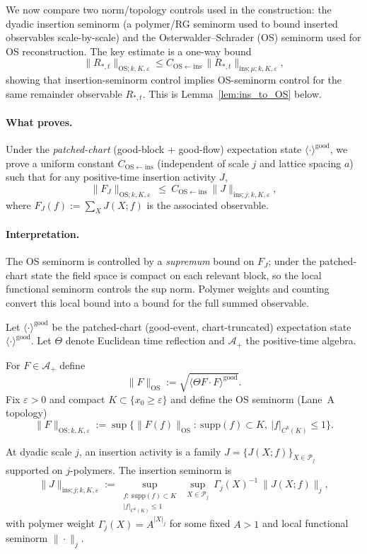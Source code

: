 We now compare two norm/topology controls used in the construction:
the dyadic insertion seminorm (a polymer/RG seminorm used to bound inserted observables scale-by-scale) and
the Osterwalder--Schrader (OS) seminorm used for OS reconstruction.
The key estimate is a one-way bound
\[
\|R_{*,t}\|_{\mathrm{OS};k,K,\varepsilon}\le C_{\mathrm{OS}\leftarrow\mathrm{ins}}\,
\|R_{*,t}\|_{\mathrm{ins};\mu;k,K,\varepsilon},
\]
showing that insertion-seminorm control implies OS-seminorm control for the same remainder observable $R_{*,t}$.
This is Lemma~\ref{lem:ins_to_OS} below.

\paragraph{What proves.}
Under the \emph{patched-chart} (good-block + good-flow) expectation state $\langle\cdot\rangle^{\mathrm{good}}$,
we prove a uniform constant $C_{\mathrm{OS}\leftarrow\mathrm{ins}}$ (independent of scale $j$ and lattice spacing $a$) such that for any
positive-time insertion activity $J$,
\[
\|F_J\|_{\mathrm{OS};k,K,\varepsilon}\ \le\ C_{\mathrm{OS}\leftarrow\mathrm{ins}}\ \|J\|_{\mathrm{ins};j;k,K,\varepsilon},
\]
where $F_J(f):=\sum_{X}J(X;f)$ is the associated observable.

\paragraph{Interpretation.}
The OS seminorm is controlled by a \emph{supremum} bound on $F_J$; under the patched-chart state the field space is compact on each relevant block,
so the local functional seminorm controls the sup norm.
Polymer weights and counting convert this local bound into a bound for the full summed observable.

Let $\langle\cdot\rangle^{\mathrm{good}}$ be the patched-chart (good-event, chart-truncated) expectation state $\langle\cdot\rangle^{\mathrm{good}}$.
Let $\Theta$ denote Euclidean time reflection and $\mathcal A_+$ the positive-time algebra.

For $F\in\mathcal A_+$ define
\[
\|F\|_{\mathrm{OS}}:=\sqrt{\langle \Theta F\cdot F\rangle^{\mathrm{good}}}.
\]
Fix $\varepsilon>0$ and compact $K\subset\{x_0\ge \varepsilon\}$ and define the OS seminorm (Lane~A topology)
\[
\|F\|_{\mathrm{OS};k,K,\varepsilon}
:=\sup\{\|F(f)\|_{\mathrm{OS}}:\ \mathrm{supp}(f)\subset K,\ |f|_{C^k(K)}\le 1\}.
\]

At dyadic scale $j$, an insertion activity is a family $J=\{J(X;f)\}_{X\in\mathscr P_j}$ supported on $j$-polymers.
The insertion seminorm is
\begin{equation}
\|J\|_{\mathrm{ins};j;k,K,\varepsilon}
:=
\sup_{\substack{f:\ \mathrm{supp}(f)\subset K\\ |f|_{C^k(K)}\le 1}}
\ \sup_{X\in\mathscr P_j}\ 
\Gamma_j(X)^{-1}\ \|J(X;f)\|_j,
\end{equation}
with polymer weight $\Gamma_j(X)=A^{|X|_j}$ for some fixed $A>1$ and local functional seminorm $\|\cdot\|_j$.

